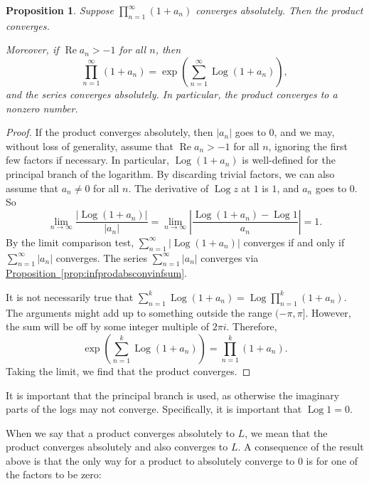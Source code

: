 \documentclass[12pt,openany]{book}
\renewcommand{\Re}{\operatorname{Re}}
\newcommand{\Log}{\operatorname{Log}}
\newcommand{\sabs}[1]{\lvert {#1} \rvert}
\newcommand{\abs}[1]{\left\lvert {#1} \right\rvert}
\theoremstyle{plain}
\newtheorem{prop}[thm]{Proposition}
\theoremstyle{remark}
\theoremstyle{definition}
\theoremstyle{exercise}
\theoremstyle{example}
\newcommand{\propref}[1]{\hyperref[#1]{Proposition~\ref*{#1}}}
\begin{document}
\begin{prop} \label{prop:infproductwithlogs}
Suppose $\prod_{n=1}^\infty (1+a_n)$ converges absolutely.
Then the product converges.

Moreover, if $\Re a_n > -1$ for all $n$, then 
\begin{equation*}
\prod_{n=1}^\infty (1+a_n)
=
\exp\left(
\sum_{n=1}^\infty \Log(1+a_n)
\right),
\end{equation*}
and the series converges absolutely.  In particular, the product
converges to a nonzero number.
\end{prop}

\begin{proof}
If the product converges absolutely, then $\sabs{a_n}$ goes to $0$, and we
may, without loss of generality, assume that $\Re a_n > -1$ for all $n$,
ignoring the first few factors if necessary.  In particular,
$\Log (1+a_n)$ is well-defined for the principal branch of the logarithm.
By discarding trivial factors, we can also assume that $a_n\neq 0$ for all $n$.
The derivative of $\Log z$ at $1$ is $1$, and $a_n$ goes to $0$.
So
\begin{equation*}
\lim_{n \to \infty}
\frac{
\abs{\Log (1+a_n)}
}{
\sabs{a_n}
}
=
\lim_{n \to \infty}
\abs{
\frac{
\Log (1+a_n)-\Log 1
}{
a_n
}
}
=1 .
\end{equation*}
By the limit comparison test,
$\sum_{n=1}^\infty \abs{\Log (1+a_n)}$
converges if and only if
$\sum_{n=1}^\infty \sabs{a_n}$ converges.
The series
$\sum_{n=1}^\infty \sabs{a_n}$ converges
via \propref{prop:infprodabsconvinfsum}.

It is not necessarily true that
$\sum_{n=1}^k \Log (1+a_n) = \Log \prod_{n=1}^k (1+a_n)$.
The arguments might add up to something outside
the range $(-\pi,\pi]$.  However, the sum will be off by some integer multiple of $2\pi i$.
Therefore,
\begin{equation*}
\exp\left(
\sum_{n=1}^k \Log(1+a_n)
\right)
=
\prod_{n=1}^k (1+a_n) .
\end{equation*}
Taking the limit, we find
that the product converges.
\end{proof}

It is important that the principal branch is used, as otherwise the imaginary
parts of the logs may not converge.  Specifically, it is important
that $\Log 1 = 0$.

When we say that a product converges absolutely to $L$, we mean that
the product converges absolutely and also converges to $L$.
A consequence of the result above is that the only way
for a product to absolutely converge to $0$ is for one of the
factors to be zero:
\end{document}

